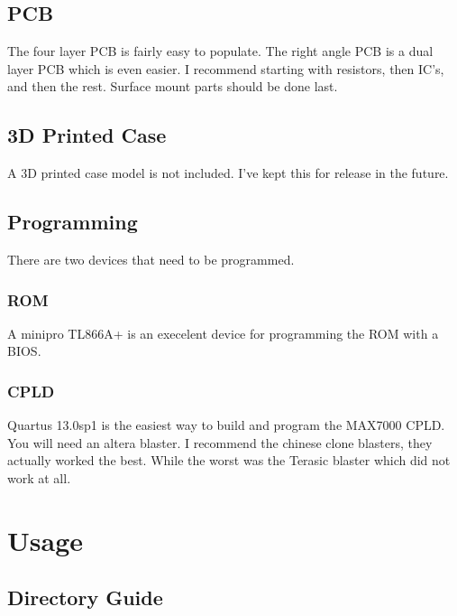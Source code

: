 \subsection{PCB}

\par
The four layer PCB is fairly easy to populate. The right angle PCB is a dual layer PCB which is even easier.
I recommend starting with resistors, then IC's, and then the rest. Surface mount parts should be done last.

\subsection{3D Printed Case}

\par
A 3D printed case model is not included. I've kept this for release in the future.

\subsection{Programming}

\par
There are two devices that need to be programmed.

\subsubsection{ROM}

\par
A minipro TL866A+ is an execelent device for programming the ROM with a BIOS.

\subsubsection{CPLD}

\par
Quartus 13.0sp1 is the easiest way to build and program the MAX7000 CPLD. You will need an altera blaster.
I recommend the chinese clone blasters, they actually worked the best. While the worst was the Terasic blaster
which did not work at all.

\newpage

\section{Usage}

\subsection{Directory Guide}

